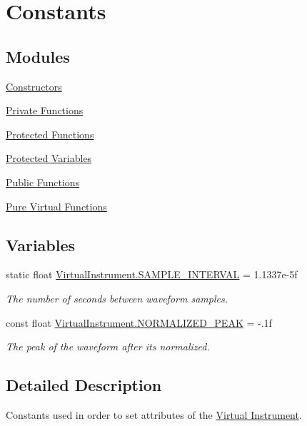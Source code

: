 \hypertarget{group___v_i_base_const}{}\section{Constants}
\label{group___v_i_base_const}
\subsection*{Modules}
\begin{DoxyCompactItemize}
\item 
\hyperlink{group___v_i_base_construct}{Constructors}
\item 
\hyperlink{group___v_i_base_priv_func}{Private Functions}
\item 
\hyperlink{group___v_i_base_pro_func}{Protected Functions}
\item 
\hyperlink{group___v_i_base_pro_var}{Protected Variables}
\item 
\hyperlink{group___v_i_base_pub_func}{Public Functions}
\item 
\hyperlink{group___v_i_base_virt_func}{Pure Virtual Functions}
\end{DoxyCompactItemize}
\subsection*{Variables}
\begin{DoxyCompactItemize}
\item 
static float \hyperlink{group___v_i_base_const_ga69a037919b64e1e3e0f2b949b2b6af2c}{Virtual\+Instrument.\+S\+A\+M\+P\+L\+E\+\_\+\+I\+N\+T\+E\+R\+V\+AL} = 1.\+1337e-\/5f
\begin{DoxyCompactList}\small\item\em The number of seconds between waveform samples. \end{DoxyCompactList}\item 
const float \hyperlink{group___v_i_base_const_gaf060c000443f92784bd8db8d866d8b2a}{Virtual\+Instrument.\+N\+O\+R\+M\+A\+L\+I\+Z\+E\+D\+\_\+\+P\+E\+AK} = -\/.\+1f
\begin{DoxyCompactList}\small\item\em The peak of the waveform after it\textquotesingle{}s normalized. \end{DoxyCompactList}\end{DoxyCompactItemize}


\subsection{Detailed Description}
Constants used in order to set attributes of the \hyperlink{group___v_i}{Virtual Instrument}. 

